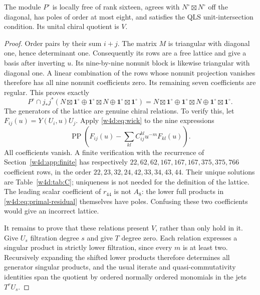 \begin{proposition}\label{w4d:prop:lattice}
The module $P^\circ$ is locally free of rank sixteen, agrees with $N^\circ\boxtimes N^\circ$ off the diagonal, has poles of order at most eight, and satisfies the QLS unit-intersection condition. Its unital chiral quotient is $V$.
\end{proposition}
\begin{proof}
Order pairs by their sum $i+j$. The matrix $M$ is triangular with diagonal one, hence determinant one. Consequently its rows are a free lattice and give a basis after inverting $u$. Its nine-by-nine nonunit block is likewise triangular with diagonal one. A linear combination of the rows whose nonunit projection vanishes therefore has all nine nonunit coefficients zero. Its remaining seven coefficients are regular. This proves exactly
\[
 P^\circ\cap j_*j^*(N\boxtimes\mathbf1^\circ\oplus
 \mathbf1^\circ\boxtimes N\oplus\mathbf1^\circ\boxtimes\mathbf1^\circ)
 =N\boxtimes\mathbf1^\circ\oplus\mathbf1^\circ\boxtimes N
   \oplus\mathbf1^\circ\boxtimes\mathbf1^\circ.
\]
The generators of the lattice are genuine chiral relations. To verify this, let $F_{ij}(u)=Y(U_i,u)U_j$. Apply \eqref{w4d:eq:wick} to the nine expressions
\begin{equation}\label{w4d:eq:primal-residual}
 \operatorname{PP}\left(F_{ij}(u)-\sum_{kl}C_{ij}^{kl}u^{-m}F_{kl}(u)\right).
\end{equation}
All coefficients vanish. A finite verification with the recurrence of Section~\ref{w4d:app:finite} has respectively $22,62,62,167,167,167,375,375,766$ coefficient rows, in the order $22,23,32,24,42,33,34,43,44$. Their unique solutions are Table~\ref{w4d:tab:C}; uniqueness is not needed for the definition of the lattice. The leading scalar coefficient of $r_{44}$ is not $A_8$: the lower full products in \eqref{w4d:eq:primal-residual} themselves have poles. Confusing these two coefficients would give an incorrect lattice.

It remains to prove that these relations present $V$, rather than only hold in it. Give $U_s$ filtration degree $s$ and give $T$ degree zero. Each relation expresses a singular product in strictly lower filtration, since every $m$ is at least two. Recursively expanding the shifted lower products therefore determines all generator singular products, and the usual iterate and quasi-commutativity identities span the quotient by ordered normally ordered monomials in the jets $T^rU_s$.


\end{proof}
